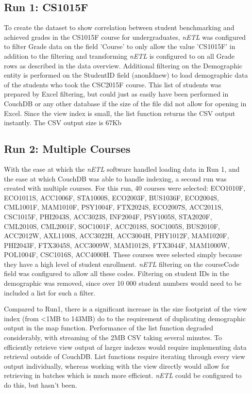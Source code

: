 \subsection{Run 1: CS1015F}
To create the dataset to show correlation between student benchmarking and achieved grades in the CS1015F course for undergraduates, \textit{nETL} was configured to filter Grade data on the field 'Course' to only allow the value 'CS1015F' in addition to the filtering and transforming \textit{nETL} is configured to on all Grade rows as described in the data overview. Additional filtering on the Demographic entity is performed on the StudentID field (anonIdnew) to load demographic data of the students who took the CSC2015F course. This list of students was prepared by Excel filtering, but could just as easily have been performed in CouchDB or any other database if the size of the file did not allow for opening in Excel. Since the view index is small, the list function returns the CSV output instantly. The CSV output size is 67Kb

\subsection{Run 2: Multiple Courses}
With the ease at which the \textit{nETL} software handled loading data in Run 1, and the ease at which CouchDB was able to handle indexing, a second run was created with multiple courses. For this run, 40 courses were selected: ECO1010F, ECO1011S, ACC1006F, STA1000S, ECO2003F, BUS1036F, ECO2004S, CML1001F, MAM1010F, PSY1004F, FTX2024S, ECO2007S, ACC2011S, CSC1015F, PHI2043S, ACC3023S, INF2004F, PSY1005S, STA2020F, CML2010S, CML2001F, SOC1001F, ACC2018S, SOC1005S, BUS2010F, ACC2012W, AXL1100S, ACC3022H, ACC3004H, PHY1012F, MAM1020F, PHI2043F, FTX3045S, ACC3009W, MAM1012S, FTX3044F, MAM1000W, POL1004F, CSC1016S, ACC4000H. These courses were selected simply because they have a high level of student enrollment. \textit{nETL} filtering on the courseCode field was configured to allow all these codes. Filtering on student IDs in the demographic was removed, since over 10 000 student numbers would need to be included a list for such a filter.

Compared to Run1, there is a significant increase in the size footprint of the view index (from \textless 1MB to 143MB) do to the requirement of duplicating demographic output in the map function. Performance of the list function degraded considerably, with streaming of the 2MB CSV taking several minutes. To efficiently retrieve view output of larger indexes would require implementing data retrieval outside of CouchDB. List functions require iterating through every view output individually, whereas working with the view directly would allow for retrieving in batches which is much more efficient. \textit{nETL} could be configured to do this, but hasn't been.

